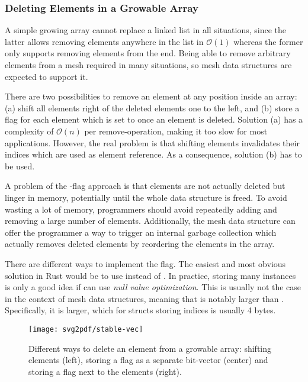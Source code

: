 \subsubsection*{Deleting Elements in a Growable Array}

A simple growing array cannot replace a linked list in all situations, since the latter allows removing elements anywhere in the list in $\mathcal O(1)$ whereas the former only supports removing elements from the end.
Being able to remove arbitrary elements from a mesh required in many situations, so mesh data structures are expected to support it.

There are two possibilities to remove an element at any position inside an array: (a) shift all elements right of the deleted elements one to the left, and (b) store a  flag for each element which is set to  once an element is deleted.
Solution (a) has a complexity of $\mathcal O(n)$ per remove-operation, making it too slow for most applications.
However, the real problem is that shifting elements invalidates their indices which are used as element reference.
As a consequence, solution (b) has to be used.

\newpage
A problem of the -flag approach is that elements are not actually deleted but linger in memory, potentially until the whole data structure is freed.
To avoid wasting a lot of memory, programmers should avoid repeatedly adding and removing a large number of elements.
Additionally, the mesh data structure can offer the programmer a way to trigger an internal garbage collection which actually removes deleted elements by reordering the elements in the array.

There are different ways to implement the  flag.
The easiest and most obvious solution in Rust would be to use  instead of .
In practice, storing many  instances is only a good idea if  can use \emph{null value optimization}.
This is usually not the case in the context of mesh data structures, meaning that  is notably larger than .
Specifically, it is  larger, which for structs storing  indices is usually 4 bytes.

\begin{figure}[t]
  \centering
  \texttt{[image: svg2pdf/stable-vec]}
  \caption{Different ways to delete an element from a growable array: shifting elements (left), storing a  flag as a separate bit-vector (center) and storing a  flag next to the elements (right).}
  \vspace{5mm}
\end{figure}

